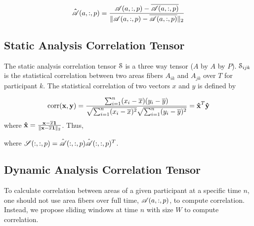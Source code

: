 \documentclass{article}[12pt]
\newcommand{\V}[2][]{{\bm{#1\mathbf{\MakeLowercase{#2}}}}}
\newcommand{\VE}[3][]{#1{\MakeLowercase{#2}}_{#3}}
\newcommand{\T}[2][]{\boldsymbol{#1\mathscr{\MakeUppercase{#2}}}}
\begin{document}
\begin{equation*}
{\T[\hat]{A}}(a,:,p) = \frac{{\T A}(a,:,p) - \overline{{\T A}(a,:,p)}}{\|{\T A}(a,:,p) - \overline{{\T A}(a,:,p)}\|_2}
\end{equation*}


\subsection{Static Analysis Correlation Tensor}
The static analysis correlation tensor ${\cal S}$ is a three way tensor ($A$ by $A$ by $P$).  ${\cal S}_{ijk}$ is the statistical correlation between two areas fibers $A_{ik}$ and $A_{jk}$ over $T$ for participant $k$.  The statistical correlation of two vectors $x$ and $y$ is defined by 

\begin{equation*}
\text{corr}(\V{x},\V{y}) = \frac{\sum_{i=1}^{n} (\VE{x}{i} - \overline{x})(\VE{y}{i} - \overline{y})}
{\sqrt{\sum_{i=1}^{n} (\VE{x}{i} - \overline{x})^2} \sqrt{\sum_{i=1}^n (\VE{y}{i} - \overline{y})^2}} 
= \mathbf{\hat{\V x}}^T\mathbf{\hat{\V y}}
\end{equation*}
where $\mathbf{\hat{\V x}} = \frac{\mathbf{\V x} - \overline{x} \mathbf{1}}{\|\mathbf{\V x} - \overline{x} \mathbf{1}\|_2}$. Thus, 

\begin{center}
\end{center}
where ${\T S}(:,:,p) = \hat{\T A}(:,:,p) \hat{\T A}(:,:,p)^T$.



\subsection{Dynamic Analysis Correlation Tensor}
To calculate correlation between areas of a given participant at a specific time $n$, one should not use area fibers over full time, ${\T A}(a,:,p)$, to compute correlation. Instead, we propose sliding windows at time $n$ with size $W$ to compute correlation.
\end{document}
